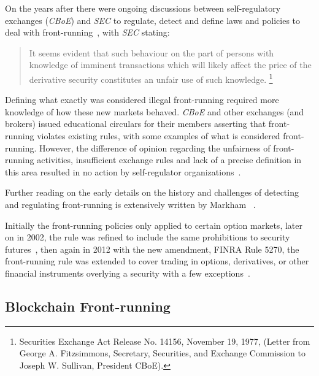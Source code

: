 
On the years after there were ongoing discussions between self-regulatory exchanges (\eg \textit{CBoE}) and \textit{SEC} to regulate, detect and define laws and policies to deal with front-running~\cite{markham1988front}, with \textit{SEC} stating: 
\begin{quote}
It seems evident that such behaviour on the part of persons with knowledge of imminent transactions which will likely affect the price of the derivative security constitutes an unfair use of such knowledge. \footnote{Securities Exchange Act Release No. 14156, November 19, 1977, (Letter from George A. Fitzsimmons, Secretary, Securities, and Exchange Commission to Joseph W. Sullivan, President  CBoE).}
\end{quote} 

Defining what exactly was considered illegal front-running required more knowledge of how these new markets behaved. \textit{CBoE} and other exchanges (and brokers) issued educational circulars for their members asserting that front-running violates existing rules, with some examples of what is considered front-running. However, the difference of opinion regarding the unfairness of front-running activities, insufficient exchange rules and lack of a precise definition in this area resulted in no action by self-regulator organizations~\cite{sec1978optionsmarket}. 

Further reading on the early details on the history and challenges of detecting and regulating front-running is extensively written by Markham~\cite{markham1988front} . %

Initially the front-running policies only applied to certain option markets, later on in 2002, the rule was refined to include the same prohibitions to security futures~\cite{finra_2002},  then again in 2012 with the new amendment, FINRA Rule 5270, the front-running rule was extended to cover trading in options, derivatives, or other financial instruments overlying a security with a few exceptions~\cite{sec2012frontrunning, finra_2012}.


\subsection{Blockchain Front-running} \label{sec:Front Running on the Blockchains}

